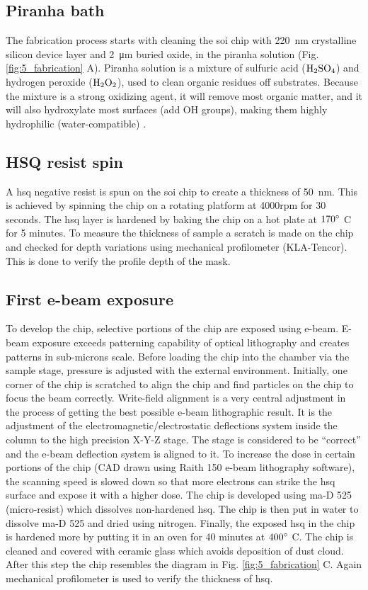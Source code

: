 \documentclass[../report.tex]{subfiles}
\begin{document}
\subsection{Piranha bath}			
The fabrication process starts with cleaning the \gls{soi} chip with \SI{220}{\nano \meter} crystalline silicon device layer and \SI{2}{\micro \meter} buried oxide, in the piranha solution (Fig. \ref{fig:5_fabrication} A). Piranha solution is a mixture of sulfuric acid ($\mathrm{H_2SO_4}$) and hydrogen peroxide ($\mathrm{H_2O_2}$), used to clean organic residues off substrates. Because the mixture is a strong oxidizing agent, it will remove most organic matter, and it will also hydroxylate most surfaces (add OH groups), making them highly hydrophilic (water-compatible) \cite{piranha_bath}. 
 
\subsection{HSQ resist spin}
A \gls{hsq} negative resist is spun on the \gls{soi} chip to create a thickness of \SI{50}{\nano \meter}. This is achieved by spinning the chip on a  rotating platform at 4000rpm for 30 seconds. The \gls{hsq} layer is hardened by baking the chip on a hot plate at $\mathrm{170^{\circ}}$ C for 5 minutes. To measure the thickness of sample a scratch is made on the chip and checked for depth variations using mechanical profilometer (KLA-Tencor). This is done to verify the profile depth of the mask.

\subsection{First e-beam exposure}
To develop the chip, selective portions of the chip are exposed using e-beam. E-beam exposure exceeds patterning capability of optical lithography and creates patterns in sub-microns scale. Before loading the chip into the chamber via the sample stage, pressure is adjusted with the external environment. Initially, one corner of the chip is scratched to align the chip and find particles on the chip to focus the beam correctly. Write-field alignment is a very central adjustment in the process of getting the best possible e-beam lithographic result. It is the adjustment of the electromagnetic/electrostatic deflections system inside the column to the high precision X-Y-Z stage. The stage is considered to be ``correct'' and the e-beam deflection system is aligned to it. To increase the dose in certain portions of the chip (CAD drawn using Raith 150 e-beam lithography software), the scanning speed is slowed down so that more electrons can strike the \gls{hsq} surface and expose it with a higher dose. The chip is developed using ma-D 525 (micro-resist) which dissolves non-hardened \gls{hsq}. The chip is then put in water to dissolve ma-D 525 and dried using nitrogen. Finally, the exposed \gls{hsq} in the chip is hardened more by putting it in an oven for 40 minutes at $\mathrm{400^{\circ}}$ C. The chip is cleaned and covered with ceramic glass which avoids deposition of dust cloud. After this step the chip resembles the diagram in Fig. \ref{fig:5_fabrication} C. Again mechanical profilometer is used to verify the thickness of \gls{hsq}.    
\end{document}
